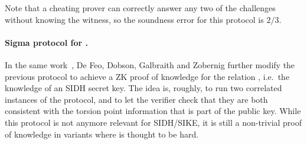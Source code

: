 Note that a cheating prover can correctly answer any two of the challenges without knowing the witness, so the soundness error for this protocol is $2/3$.



\paragraph{Sigma protocol for \R[SIDH].}
In the same work~\cite{DFDGZ21}, De Feo, Dobson, Galbraith and Zobernig further modify the previous protocol to achieve a ZK proof of knowledge for the relation \R[SIDH], i.e.\ the knowledge of an SIDH secret key.
The idea is, roughly, to run two correlated instances of the protocol, and to let the verifier check that they are both consistent with the torsion point information that is part of the public key.
While this protocol is not anymore relevant for SIDH/SIKE, it is still a non-trivial proof of knowledge in variants where \R[SIDH] is thought to be hard.

